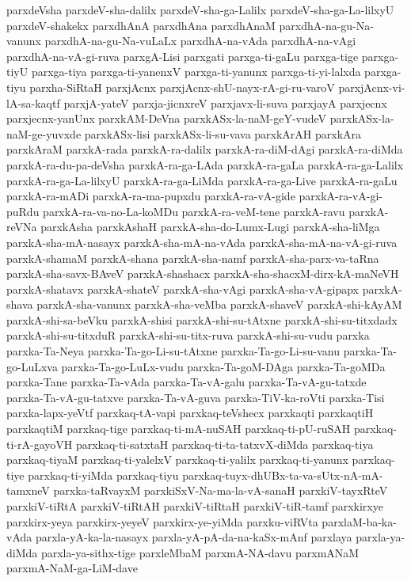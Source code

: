 {parxdeVsha
parxdeV-sha-dalilx
parxdeV-sha-ga-Lalilx
parxdeV-sha-ga-La-lilxyU
parxdeV-shakekx
parxdhAnA
parxdhAna
parxdhAnaM
parxdhA-na-gu-Na-vanunx
parxdhA-na-gu-Na-vuLaLx
parxdhA-na-vAda
parxdhA-na-vAgi
parxdhA-na-vA-gi-ruva
parxgA-Lisi
parxgati
parxga-ti-gaLu
parxga-tige
parxga-tiyU
parxga-tiya
parxga-ti-yanenxV
parxga-ti-yanunx
parxga-ti-yi-lalxda
parxga-tiyu
parxha-SiRtaH
parxjAcnx
parxjAcnx-shU-nayx-rA-gi-ru-varoV
parxjAcnx-vi-lA-sa-kaqtf
parxjA-yateV
parxja-jicnxreV
parxjavx-li-suva
parxjayA
parxjecnx
parxjecnx-yanUnx
parxkAM-DeVna
parxkASx-la-naM-geY-vudeV
parxkASx-la-naM-ge-yuvxde
parxkASx-lisi
parxkASx-li-su-vava
parxkArAH
parxkAra
parxkAraM
parxkA-rada
parxkA-ra-dalilx
parxkA-ra-diM-dAgi
parxkA-ra-diMda
parxkA-ra-du-pa-deVsha
parxkA-ra-ga-LAda
parxkA-ra-gaLa
parxkA-ra-ga-Lalilx
parxkA-ra-ga-La-lilxyU
parxkA-ra-ga-LiMda
parxkA-ra-ga-Live
parxkA-ra-gaLu
parxkA-ra-mADi
parxkA-ra-ma-pupxdu
parxkA-ra-vA-gide
parxkA-ra-vA-gi-puRdu
parxkA-ra-va-no-La-koMDu
parxkA-ra-veM-tene
parxkA-ravu
parxkA-reVNa
parxkAsha
parxkAshaH
parxkA-sha-do-Lumx-Lugi
parxkA-sha-liMga
parxkA-sha-mA-nasayx
parxkA-sha-mA-na-vAda
parxkA-sha-mA-na-vA-gi-ruva
parxkA-shamaM
parxkA-shana
parxkA-sha-namf
parxkA-sha-parx-va-taRna
parxkA-sha-savx-BAveV
parxkA-shashacx
parxkA-sha-shacxM-dirx-kA-maNeVH
parxkA-shatavx
parxkA-shateV
parxkA-sha-vAgi
parxkA-sha-vA-gipapx
parxkA-shava
parxkA-sha-vanunx
parxkA-sha-veMba
parxkA-shaveV
parxkA-shi-kAyAM
parxkA-shi-sa-beVku
parxkA-shisi
parxkA-shi-su-tAtxne
parxkA-shi-su-titxdadx
parxkA-shi-su-titxduR
parxkA-shi-su-titx-ruva
parxkA-shi-su-vudu
parxka
parxka-Ta-Neya
parxka-Ta-go-Li-su-tAtxne
parxka-Ta-go-Li-su-vanu
parxka-Ta-go-LuLxva
parxka-Ta-go-LuLx-vudu
parxka-Ta-goM-DAga
parxka-Ta-goMDa
parxka-Tane
parxka-Ta-vAda
parxka-Ta-vA-galu
parxka-Ta-vA-gu-tatxde
parxka-Ta-vA-gu-tatxve
parxka-Ta-vA-guva
parxka-TiV-ka-roVti
parxka-Tisi
parxka-lapx-yeVtf
parxkaq-tA-vapi
parxkaq-teVshecx
parxkaqti
parxkaqtiH
parxkaqtiM
parxkaq-tige
parxkaq-ti-mA-nuSAH
parxkaq-ti-pU-ruSAH
parxkaq-ti-rA-gayoVH
parxkaq-ti-satxtaH
parxkaq-ti-ta-tatxvX-diMda
parxkaq-tiya
parxkaq-tiyaM
parxkaq-ti-yalelxV
parxkaq-ti-yalilx
parxkaq-ti-yanunx
parxkaq-tiye
parxkaq-ti-yiMda
parxkaq-tiyu
parxkaq-tuyx-dhUBx-ta-va-sUtx-nA-mA-tamxneV
parxka-taRvayxM
parxkiSxV-Na-ma-la-vA-sanaH
parxkiV-tayxRteV
parxkiV-tiRtA
parxkiV-tiRtAH
parxkiV-tiRtaH
parxkiV-tiR-tamf
parxkirxye
parxkirx-yeya
parxkirx-yeyeV
parxkirx-ye-yiMda
parxku-viRVta
parxlaM-ba-ka-vAda
parxla-yA-ka-la-nasayx
parxla-yA-pA-da-na-kaSx-mAnf
parxlaya
parxla-ya-diMda
parxla-ya-sithx-tige
parxleMbaM
parxmA-NA-davu
parxmANaM
parxmA-NaM-ga-LiM-dave
}
